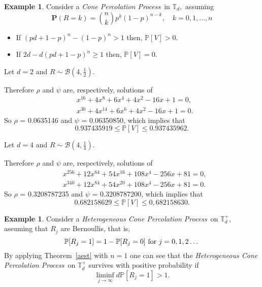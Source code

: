\documentclass[12pt,reqno,oneside]{amsart}
\theoremstyle{plain}
\theoremstyle{definition}
\newtheorem{exa}[teo]{Example}
\numberwithin{equation}{section}
\begin{document}
\begin{exa} 
\label{C:CSPAHB}
Consider a {\textit{Cone Percolation Process}}\ in ${{\mathbb T}}_d,$ assuming
\[
{{\mathbf P}}(R = k) = \binom{n}{k}p^k(1-p)^{n-k}  , \quad k=0,1,\dots, n
\]

\begin{itemize}
\item If $(pd+1-p)^n - (1-p)^n > 1$ then, ${{\mathbb P}}[V]>0$.
\item If $2d - d(pd+1-p)^n \geq 1$ then, ${{\mathbb P}}[V]=0$.
\end{itemize}

Let $d=2$ and $R \sim \mathcal{B}(4,\frac{1}{2})$. 

Therefore $\rho$ and $\psi$ are, respectively,
solutions of
\begin{align*}
& x^{16} + 4x^8 + 6x^4 + 4x^2 - 16x + 1 = 0, \\& x^{30} + 4x^{14} +
6x^6 + 4x^2 - 16x + 1 = 0.
\end{align*}
So $\rho$ = 0.0635146 and $\psi$ = 0.06350850, which implies that
\[
0.937435919 \leq {{\mathbb P}}[V] \leq 0.937435962.
\]

Let $d=4$ and $R \sim \mathcal{B}(4,\frac{1}{4})$. 

Therefore $\rho$ and $\psi$ are, respectively,
solutions of
\begin{align*}
& x^{256} + 12x^{64} + 54x^{16} + 108x^{4} - 256x + 81 = 0, \\&
x^{340} + 12x^{84} + 54x^{20} + 108x^{4} - 256x + 81 = 0.
\end{align*}
So $\rho$ = 0.3208787235 and $\psi$ = 0.3208787200, which implies that
\[
0.682158629 \leq {{\mathbb P}}[V] \leq 0,682158630.
\]
\end{exa}

\begin{exa} \label{aeslp}
Consider a {\textit{Heterogeneous Cone Percolation Process}}\ on ${{\mathbb T}}^+_d,$ assuming that $R_j$ are Bernoullis, that is,
\begin{displaymath}
{{\mathbb P}}[R_j = 1] = 1 - {{\mathbb P}}[R_j = 0] \hbox{ for } j = 0,1,2\dots
\end{displaymath}
By applying Theorem~\ref{aest} with $n = 1$ one can see that the {\textit{Heterogeneous Cone Percolation Process}}\ 
on ${{\mathbb T}}^+_d$ survives with positive probability if
\begin{displaymath}
\liminf_{j\rightarrow \infty} d {{\mathbb P}}[R_j = 1] > 1.
\end{displaymath}

\end{exa}
\end{document}

